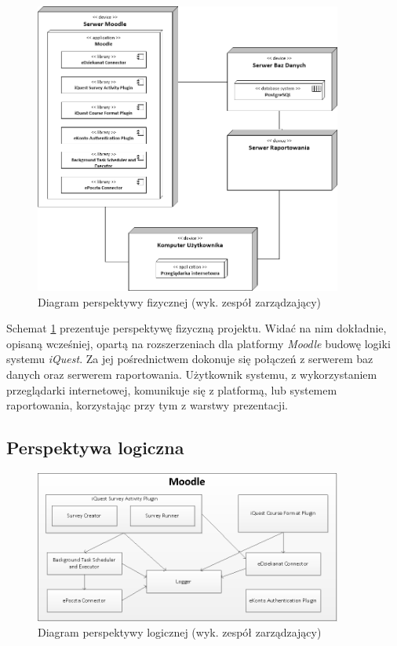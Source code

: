 \begin{figure}[H]
\centering\includegraphics[width=0.9\textwidth]{figures/PhysicalView}
\caption{Diagram perspektywy fizycznej (wyk. zespół zarządzający)}\label{rys:PerspektywaFizyczna}
\end{figure}

Schemat \ref{rys:PerspektywaFizyczna} prezentuje perspektywę fizyczną projektu. Widać na nim dokładnie, opisaną wcześniej, opartą na rozszerzeniach dla platformy \textit{Moodle} budowę logiki systemu \textit{iQuest}. Za jej pośrednictwem dokonuje się połączeń z serwerem baz danych oraz serwerem raportowania. Użytkownik systemu, z wykorzystaniem przeglądarki internetowej, komunikuje się z platformą, lub systemem raportowania, korzystając przy tym z warstwy prezentacji.

\subsection{Perspektywa logiczna}
\label{Chapter542}

\begin{figure}[H]
\centering\includegraphics[width=0.9\textwidth]{figures/LogicalView}
\caption{Diagram perspektywy logicznej (wyk. zespół zarządzający)}\label{rys:PerspektywaLogiczna}
\end{figure}

